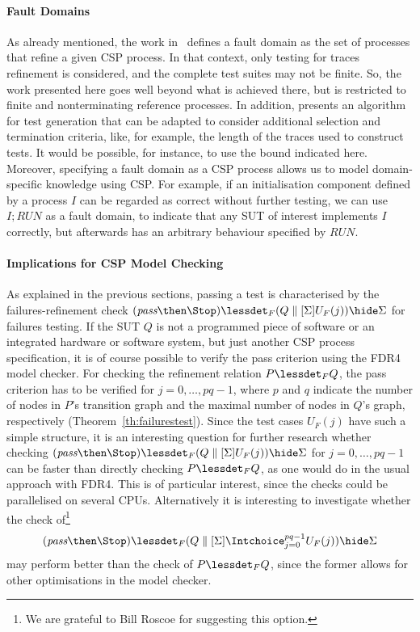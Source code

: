 \paragraph{Fault Domains} As already mentioned, the work
in~\cite{DBLP:conf/pts/CavalcantiS17} defines a fault domain as the set of
processes that refine a given CSP process.  In that context, only testing for
traces refinement is considered, and the complete test suites may not be
finite. So, the work presented here goes well beyond what is achieved there,
but is restricted to finite and nonterminating reference processes. In
addition, \cite{DBLP:conf/pts/CavalcantiS17} presents an algorithm for test
generation that can be adapted to consider additional selection and
termination criteria, like, for example, the length of the traces used to
construct tests. It would be possible, for instance, to use the bound
indicated here. Moreover, specifying a fault domain as a CSP process allows
us to model domain-specific knowledge using CSP. For example, if an
initialisation component defined by a process $I$ can be regarded as correct
without further testing, we can use $I; RUN$ as a fault domain, to indicate
that any SUT of interest implements $I$ correctly, but afterwards has an
arbitrary behaviour specified by $RUN$.

\paragraph{Implications for CSP Model Checking} As explained in the previous
sections, passing a test is characterised by the failures-refinement check
$(\epass\then\Stop) \lessdet_F (Q\parallel[\Sigma] U_F(j)) \hide \Sigma$ for
failures testing. If the SUT $Q$ is not a programmed piece of software or an
integrated hardware or software system, but just another CSP process
specification, it is of course possible to verify the pass criterion using
the FDR4 model checker. For checking the refinement relation $P\lessdet_F Q$,
the pass criterion has to be verified for $j=0,\dots,pq-1$, where $p$ and $q$
indicate the number of nodes in $P$'s transition graph and the maximal number
of nodes in $Q$'s graph, respectively (Theorem~\ref{th:failurestest}). Since
the test cases $U_F(j)$ have such a simple structure, it is an interesting
question for further research whether checking $(\epass\then\Stop) \lessdet_F
(Q\parallel[\Sigma] U_F(j)) \hide \Sigma$ for $j=0,\dots,pq-1$ can be faster
than directly checking $P\lessdet_F Q$, as one would do in the usual approach
with FDR4. This is of particular interest, since the checks could be
parallelised on several CPUs. Alternatively it is interesting to investigate
whether the check of\footnote{We are grateful to Bill Roscoe for suggesting
this option.}
\[
(\epass\then\Stop) \lessdet_F (Q\parallel[\Sigma] \Intchoice_{j=0}^{pq-1} U_F(j)) \hide \Sigma
\]
may perform better than the check of $P\lessdet_F Q$, since the former allows for
other optimisations in the model checker.

